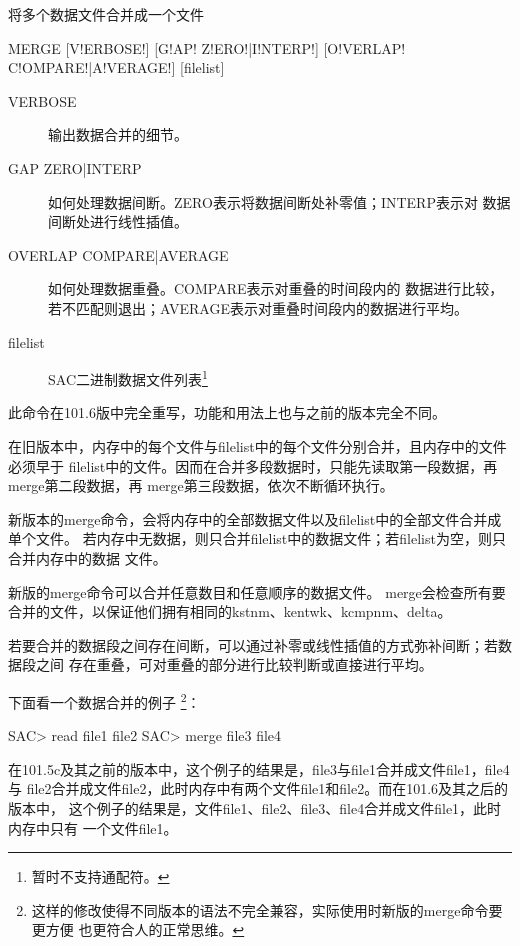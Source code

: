 \label{cmd:merge}

将多个数据文件合并成一个文件

\begin{SACSTX}
MERGE [V!ERBOSE!] [G!AP! Z!ERO!|I!NTERP!] [O!VERLAP! C!OMPARE!|A!VERAGE!] [filelist]
\end{SACSTX}

\begin{description}
\item [VERBOSE] 输出数据合并的细节。
\item [GAP ZERO|INTERP] 如何处理数据间断。ZERO表示将数据间断处补零值；INTERP表示对
    数据间断处进行线性插值。
\item [OVERLAP COMPARE|AVERAGE] 如何处理数据重叠。COMPARE表示对重叠的时间段内的
    数据进行比较，若不匹配则退出；AVERAGE表示对重叠时间段内的数据进行平均。
\item [filelist] SAC二进制数据文件列表\footnote{暂时不支持通配符。}
\end{description}

此命令在101.6版中完全重写，功能和用法上也与之前的版本完全不同。

在旧版本中，内存中的每个文件与filelist中的每个文件分别合并，且内存中的文件必须早于
filelist中的文件。因而在合并多段数据时，只能先读取第一段数据，再merge第二段数据，再
merge第三段数据，依次不断循环执行。

新版本的merge命令，会将内存中的全部数据文件以及filelist中的全部文件合并成单个文件。
若内存中无数据，则只合并filelist中的数据文件；若filelist为空，则只合并内存中的数据
文件。

新版的merge命令可以合并任意数目和任意顺序的数据文件。
merge会检查所有要合并的文件，以保证他们拥有相同的kstnm、kentwk、kcmpnm、delta。

若要合并的数据段之间存在间断，可以通过补零或线性插值的方式弥补间断；若数据段之间
存在重叠，可对重叠的部分进行比较判断或直接进行平均。

下面看一个数据合并的例子
\footnote{这样的修改使得不同版本的语法不完全兼容，实际使用时新版的merge命令要更方便
也更符合人的正常思维。}：
\begin{SACCode}
SAC> read file1 file2
SAC> merge file3 file4
\end{SACCode}
在101.5c及其之前的版本中，这个例子的结果是，file3与file1合并成文件file1，file4与
file2合并成文件file2，此时内存中有两个文件file1和file2。而在101.6及其之后的版本中，
这个例子的结果是，文件file1、file2、file3、file4合并成文件file1，此时内存中只有
一个文件file1。


